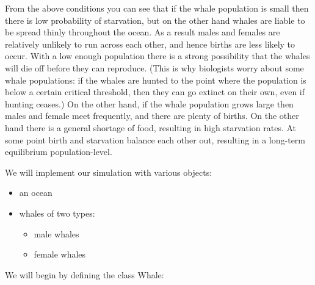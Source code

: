 \documentclass[]{book}
\providecommand{\tightlist}{%
  \setlength{\itemsep}{0pt}\setlength{\parskip}{0pt}}
\theoremstyle{definition}
\theoremstyle{definition}
\theoremstyle{definition}
\theoremstyle{remark}
\begin{document}
{From the above conditions you can see that if the whale population is
small then there is low probability of starvation, but on the other hand
whales are liable to be spread thinly throughout the ocean. As a result
males and females are relatively unlikely to run across each other, and
hence births are less likely to occur. With a low enough population
there is a strong possibility that the whales will die off before they
can reproduce. (This is why biologists worry about some whale
populations: if the whales are hunted to the point where the population
is below a certain critical threshold, then they can go extinct on their
own, even if hunting ceases.) On the other hand, if the whale population
grows large then males and female meet frequently, and there are plenty
of births. On the other hand there is a general shortage of food,
resulting in high starvation rates. At some point birth and starvation
balance each other out, resulting in a long-term equilibrium
population-level.

We will implement our simulation with various objects:

\begin{itemize}
\tightlist
\item
  an ocean
\item
  whales of two types:

  \begin{itemize}
  \tightlist
  \item
    male whales
  \item
    female whales
  \end{itemize}
\end{itemize}

We will begin by defining the class Whale:

}
\end{document}
